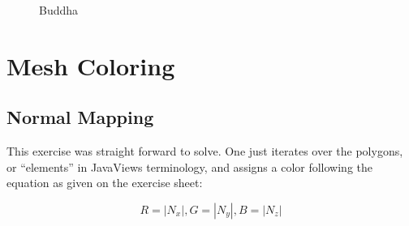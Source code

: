 \documentclass[a4paper,10pt,notitlepage]{scrreprt}
\begin{document}
\begin{figure}

  \caption{Buddha}
\end{figure}

\chapter{Mesh Coloring}

\section{Normal Mapping}

This exercise was straight forward to solve. One just iterates over the
polygons, or ``elements'' in JavaViews terminology, and assigns a color
following the equation as given on the exercise sheet:

\begin{equation}
  R = |N_x|, G = |N_y|, B = |N_z|
 \label{eq:normal-mapping}
\end{equation}
\end{document}
